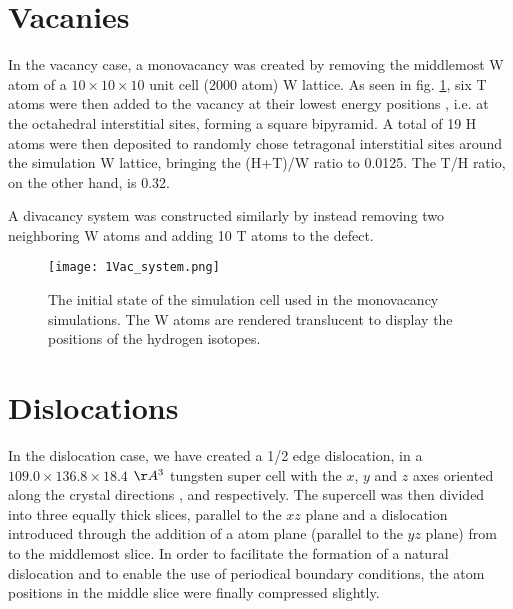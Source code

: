 \section{Vacanies}
In the vacancy case, a monovacancy was created by removing the middlemost W atom of a $10\times 10 \times 10$ unit cell (2000 atom) W lattice. As seen in fig. \ref{Fig:monovac_system}, six T atoms were then added to the vacancy at their lowest energy positions \cite{heinola2010hydrogen}, i.e. at the octahedral interstitial sites, forming a square bipyramid. A total of 19 H atoms were then deposited to randomly chose tetragonal interstitial sites around the simulation W lattice, bringing the (H+T)/W ratio to 0.0125. The T/H ratio, on the other hand, is 0.32.

A divacancy system was constructed similarly by instead removing two neighboring W atoms and adding 10 T atoms to the defect.

\begin{figure}[!ht]
\center
\texttt{[image: 1Vac\_system.png]}
\caption{The initial state of the simulation cell used in the monovacancy simulations. The W atoms are rendered translucent to display the positions of the hydrogen isotopes.}
\label{Fig:monovac_system}
\end{figure}

\section{Dislocations}
In the dislocation case, we have created a 1/2\hkl[1 1 1] edge dislocation, in a $109.0 \times 136.8 \times 18.4$ $\AA^3$ tungsten super cell with the $x$, $y$ and $z$ axes oriented along the crystal directions  \hkl[1 1 1], \hkl[1 1 -2] and \hkl[-1 1 0] respectively. The supercell was then divided into three equally thick slices, parallel to the $xz$ plane and a dislocation introduced through the addition of a  atom plane (parallel to the $yz$ plane) from to the middlemost slice. In order to facilitate the formation of a natural dislocation and to enable the use of periodical boundary conditions, the atom positions in the middle slice were finally compressed slightly.



